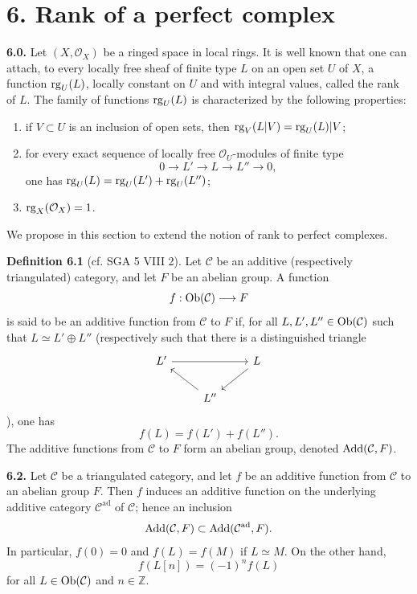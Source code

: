 \documentclass[11pt]{article}
\begin{document}
\section*{6. Rank of a perfect complex}

\textbf{6.0.} Let \((X,\mathcal O_X)\) be a ringed space in local rings. It is well known that one can attach, to every locally free sheaf of finite type \(L\) on an open set \(U\) of \(X\), a function \(\operatorname{rg}_U(L)\), locally constant on \(U\) and with integral values, called the rank of \(L\). The family of functions \(\operatorname{rg}_U(L)\) is characterized by the following properties:
\begin{enumerate}[label=(\roman*)]
\item if \(V\subset U\) is an inclusion of open sets, then \(\operatorname{rg}_V(L|V)=\operatorname{rg}_U(L)|V\);
\item for every exact sequence of locally free \(\mathcal O_U\)-modules of finite type
\[
  0\longrightarrow L'\longrightarrow L\longrightarrow L''\longrightarrow 0,
\]
one has \(\operatorname{rg}_U(L)=\operatorname{rg}_U(L')+\operatorname{rg}_U(L'')\);
\item \(\operatorname{rg}_X(\mathcal O_X)=1\).
\end{enumerate}
We propose in this section to extend the notion of rank to perfect complexes.

\textbf{Definition 6.1} (cf. SGA 5 VIII 2). Let \(\mathcal C\) be an additive (respectively triangulated) category, and let \(F\) be an abelian group. A function
\[
  f:\operatorname{Ob}(\mathcal C)\longrightarrow F
\]
is said to be an additive function from \(\mathcal C\) to \(F\) if, for all \(L,L',L''\in\operatorname{Ob}(\mathcal C)\) such that \(L\simeq L'\oplus L''\) (respectively such that there is a distinguished triangle
\[
\begin{tikzcd}
L' \arrow[rr] && L \arrow[dl]\\
& L'' \arrow[ul] &
\end{tikzcd}
\]
), one has
\[
  f(L)=f(L')+f(L'').
\]
The additive functions from \(\mathcal C\) to \(F\) form an abelian group, denoted \(\operatorname{Add}(\mathcal C,F)\).

\textbf{6.2.} Let \(\mathcal C\) be a triangulated category, and let \(f\) be an additive function from \(\mathcal C\) to an abelian group \(F\). Then \(f\) induces an additive function on the underlying additive category \(\mathcal C^{\mathrm{ad}}\) of \(\mathcal C\); hence an inclusion
\[
  \operatorname{Add}(\mathcal C,F)\subset \operatorname{Add}(\mathcal C^{\mathrm{ad}},F).
\]
In particular, \(f(0)=0\) and \(f(L)=f(M)\) if \(L\simeq M\). On the other hand,
\[
  f(L[n])=(-1)^n f(L)
\]
for all \(L\in\operatorname{Ob}(\mathcal C)\) and \(n\in\mathbb Z\).
\end{document}
